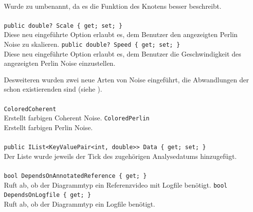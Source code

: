 \paragraph{}
\begin{itemize}
	\change Wurde zu   umbenannt, da es die Funktion des Knotens besser beschreibt.
\end{itemize}

\paragraph{}
\begin{itemize}
	\add \verb!public double? Scale { get; set; }! \\
	Diese neu eingeführte Option erlaubt es, dem Benutzer den angezeigten Perlin Noise zu skalieren.
	\add \verb!public double? Speed { get; set; }! \\
	Diese neu eingeführte Option erlaubt es, dem Benutzer die Geschwindigkeit des angezeigten Perlin Noise einzustellen.
\end{itemize}
Desweiteren wurden zwei neue Arten von Noise eingeführt, die Abwandlungen der schon existierenden sind (siehe ).

\paragraph{}
\begin{itemize}
	\add \verb!ColoredCoherent! \\
	Erstellt farbigen Coherent Noise.
	\add \verb!ColoredPerlin! \\
	Erstellt farbigen Perlin Noise.
\end{itemize}

\paragraph{}
\begin{itemize}
	\change \verb!public IList<KeyValuePair<int, double>> Data { get; set; }! \\
	Der Liste wurde jeweils der Tick des zugehörigen Analysedatums hinzugefügt.
\end{itemize}

\paragraph{}
\begin{itemize}
	\add \verb!bool DependsOnAnnotatedReference { get; }! \\
	Ruft ab, ob der Diagrammtyp ein Referenzvideo mit Logfile benötigt.
	\add \verb!bool DependsOnLogfile { get; }! \\
	Ruft ab, ob der Diagrammtyp ein Logfile benötigt.
\end{itemize}

